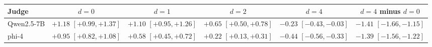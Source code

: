 \begin{tabular}{lccccc}
\toprule
Judge & $d{=}0$ & $d{=}1$ & $d{=}2$ & $d{=}4$ & $d{=}4$ minus $d{=}0$ \\
\midrule
Qwen2.5-7B & $+1.18$ {\scriptsize$[+0.99,+1.37]$} & $+1.10$ {\scriptsize$[+0.95,+1.26]$} & $+0.65$ {\scriptsize$[+0.50,+0.78]$} & $-0.23$ {\scriptsize$[-0.43,-0.03]$} & $-1.41$ {\scriptsize$[-1.66,-1.15]$} \\
phi-4 & $+0.95$ {\scriptsize$[+0.82,+1.08]$} & $+0.58$ {\scriptsize$[+0.45,+0.72]$} & $+0.22$ {\scriptsize$[+0.13,+0.31]$} & $-0.44$ {\scriptsize$[-0.56,-0.33]$} & $-1.39$ {\scriptsize$[-1.56,-1.22]$} \\
\bottomrule
\end{tabular}
